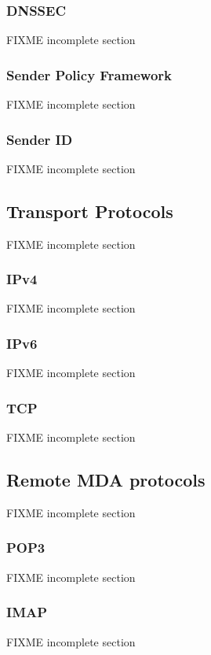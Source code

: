 \subsubsection{DNSSEC}
\cite{RFC5155}
FIXME incomplete section

\subsubsection{Sender Policy Framework}
\cite{RFC4408}
\cite{RFC6652}
FIXME incomplete section

\subsubsection{Sender ID}
\cite{RFC4401}
FIXME incomplete section

\subsection{Transport Protocols}
FIXME incomplete section

\subsubsection{IPv4}
\cite{RFC760}
\cite{RFC791}
\cite{RFC1180}
\cite{RFC792}
\cite{RFC919}
\cite{RFC922}
\cite{RFC950}
\cite[p.~3]{RFC793}
FIXME incomplete section

\subsubsection{IPv6}
\cite{RFC2460}
FIXME incomplete section

\subsubsection{TCP}
FIXME incomplete section

\subsection{Remote MDA protocols}
FIXME incomplete section

\subsubsection{POP3}
\cite{RFC1939}
FIXME incomplete section

\subsubsection{IMAP}
\cite{RFC3501}
FIXME incomplete section

